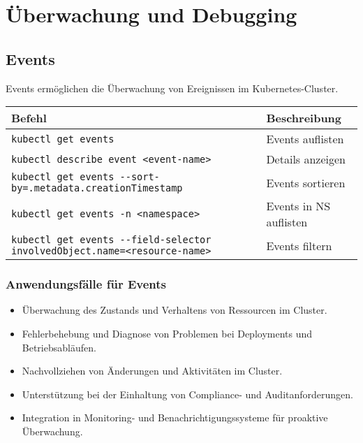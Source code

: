 \chapter{Überwachung und Debugging}

\section{Events}
Events ermöglichen die Überwachung von Ereignissen im Kubernetes-Cluster.\\

\noindent
\begin{tabular}{|p{}|p{}|}
\hline
\textbf{Befehl} & \textbf{Beschreibung} \\
\hline
\texttt{kubectl get events} & Events auflisten \\
\texttt{kubectl describe event <event-name>} & Details anzeigen \\
\texttt{kubectl get events {-}{-}sort-by=.metadata.creationTimestamp} & Events sortieren \\
\texttt{kubectl get events -n <namespace>} & Events in NS auflisten \\
\texttt{kubectl get events {-}{-}field-selector involvedObject.name=<resource-name>} & Events filtern \\
\hline
\end{tabular}

\subsection{Anwendungsfälle für Events}
\begin{itemize}
    \item Überwachung des Zustands und Verhaltens von Ressourcen im Cluster.
    \item Fehlerbehebung und Diagnose von Problemen bei Deployments und Betriebsabläufen.
    \item Nachvollziehen von Änderungen und Aktivitäten im Cluster.
    \item Unterstützung bei der Einhaltung von Compliance- und Auditanforderungen.
    \item Integration in Monitoring- und Benachrichtigungssysteme für proaktive Überwachung.
\end{itemize}

